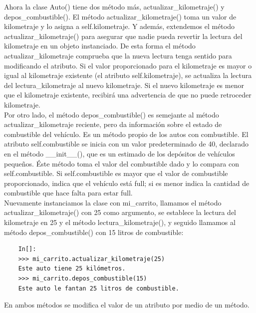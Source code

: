 {Ahora la clase {\ttfamily Auto()} tiene dos método  más,  {\ttfamily actualizar\_kilometraje()} y {\ttfamily depos\_combustible()}.  El método  {\ttfamily actualizar\_kilometraje()}  toma un valor de kilometraje y lo asigna a {\ttfamily self.kilometraje}. Y además, extendemos el método {\ttfamily actualizar\_kilometraje()} para asegurar que nadie pueda revertir la lectura del kilometraje en un objeto instanciado.  De esta forma el método {\ttfamily actualizar\_kilometraje} comprueba que la nueva lectura tenga sentido para  modificando el atributo.
Si el valor proporcionado para el kilometraje es mayor o igual al kilometraje existente (el atributo {\ttfamily self.kilometraje}), se actualiza  la lectura del {\ttfamily lectura\_kilometraje} al nuevo kilometraje. Si el nuevo kilometraje es menor
que el kilometraje existente, recibirá una advertencia de que no puede retroceder  kilometraje. \\


Por otro lado, el método {\ttfamily depos\_combustible()} es semejante al método  {\ttfamily actualizar\_kilometraje} 
reciente, pero da información sobre el estado de combustible del vehículo. Es un método propio de los autos con combustible.  El atributo {\ttfamily self.combustible} se inicia con un valor predeterminado de 40, declarado en el método    {\ttfamily \_\!\_init\_\!\_()}, que es un estimado de los depósitos de vehículos pequeños. 
Éste método toma el valor del combustible dado y lo compara con {\ttfamily self.combustible}.  Si {\ttfamily self.combustible} es mayor que el valor de combustible proporcionado, indica que el vehículo está full; si es menor indica la cantidad de combustible que hace falta para estar full.\\

Nuevamente instanciamos la clase con {\ttfamily mi\_carrito}, llamamos el método  {\ttfamily actualizar\_kilometraje()} con 25 como argumento, se establece la lectura del kilometraje en 25 y el método  {\ttfamily lectura\_kilometraje()}, y seguido llamamos al método {\ttfamily depos\_combustible()} con 15 litros de combustible:

\begin{lstlisting}
	In[]:
	>>> mi_carrito.actualizar_kilometraje(25)
	Este auto tiene 25 kilómetros.
	>>> mi_carrito.depos_combustible(15)
	Este auto le fantan 25 litros de combustible.
\end{lstlisting}

En ambos métodos se modifica el valor de un atributo por medio de un método.\\

}
